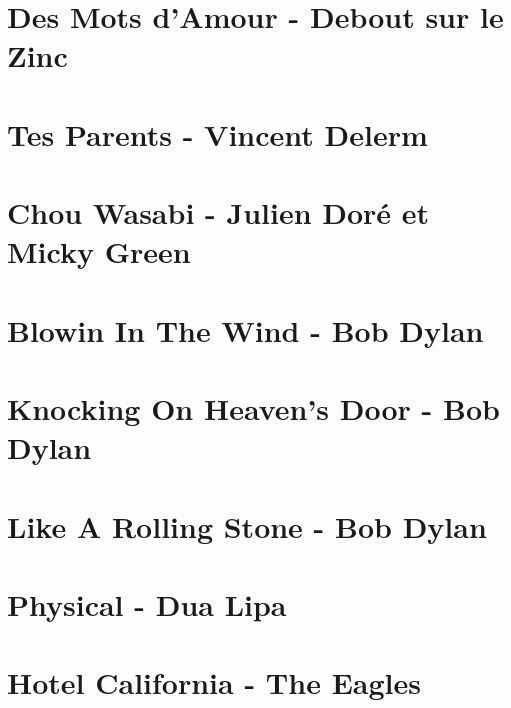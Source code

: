 \documentclass[11pt]{article}
\begin{document}
\section{Des Mots d'Amour - Debout sur le Zinc}


\section{Tes Parents - Vincent Delerm}


\section{Chou Wasabi - Julien Doré et Micky Green}
\begin{guitar}

\end{guitar}


\section{Blowin In The Wind - Bob Dylan}
\begin{guitar}

\end{guitar}



\section{Knocking On Heaven's Door - Bob Dylan}
\begin{guitar}

\end{guitar}

\section*{Like A Rolling Stone - Bob Dylan}
\begin{guitar}

\end{guitar}


\section{Physical - Dua Lipa}
\begin{guitar}

\end{guitar}

\section{Hotel California - The Eagles}
\begin{guitar}

\end{guitar}
\end{document}

